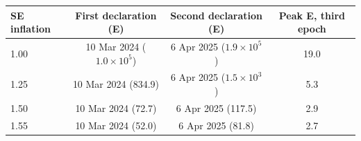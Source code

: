 \begin{tabular}{lccc}
\toprule
SE inflation & First declaration (E) & Second declaration (E) & Peak E, third epoch \\
\midrule
1.00 & 10 Mar 2024 ($1.0\times 10^{5}$) & 6 Apr 2025 ($1.9\times 10^{5}$) & 19.0 \\
1.25 & 10 Mar 2024 (834.9) & 6 Apr 2025 ($1.5\times 10^{3}$) & 5.3 \\
1.50 & 10 Mar 2024 (72.7) & 6 Apr 2025 (117.5) & 2.9 \\
1.55 & 10 Mar 2024 (52.0) & 6 Apr 2025 (81.8) & 2.7 \\
\bottomrule
\end{tabular}

